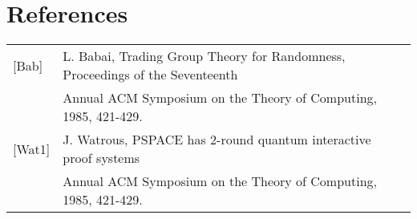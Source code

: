 \documentclass[12pt]{article}
\begin{document}
	\newpage	
	\section*{References}
	\begin{tabular}{ l l }
		\label{bab}[Bab] & L. Babai, Trading Group Theory for Randomness, Proceedings of the Seventeenth\\& Annual ACM
		Symposium on the Theory of Computing, 1985, 421-429.\\
		\label{wat1}[Wat1] & J. Watrous, PSPACE has 2-round quantum interactive proof systems\\& Annual ACM
		Symposium on the Theory of Computing, 1985, 421-429.\\
		
	\end{tabular}
	
		
\end{document}
